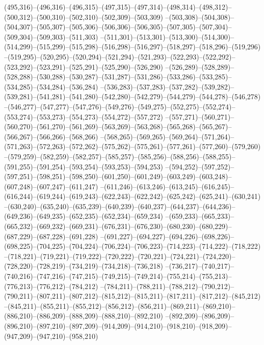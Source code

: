 (495,316)--(496,316)--(496,315)--(497,315)--(497,314)--(498,314)--(498,312)--(500,312)--(500,310)--(502,310)--(502,309)--(503,309)
--(503,308)--(504,308)--(504,307)--(505,307)--(505,306)--(506,306)--(506,305)--(507,305)--(507,304)--(509,304)--(509,303)--(511,303)
--(511,301)--(513,301)--(513,300)--(514,300)--(514,299)--(515,299)--(515,298)--(516,298)--(516,297)--(518,297)--(518,296)--(519,296)
--(519,295)--(520,295)--(520,294)--(521,294)--(521,293)--(522,293)--(522,292)--(523,292)--(523,291)--(525,291)--(525,290)--(526,290)
--(526,289)--(528,289)--(528,288)--(530,288)--(530,287)--(531,287)--(531,286)--(533,286)--(533,285)--(534,285)--(534,284)--(536,284)
--(536,283)--(537,283)--(537,282)--(539,282)--(539,281)--(541,281)--(541,280)--(542,280)--(542,279)--(544,279)--(544,278)--(546,278)
--(546,277)--(547,277)--(547,276)--(549,276)--(549,275)--(552,275)--(552,274)--(553,274)--(553,273)--(554,273)--(554,272)--(557,272)
--(557,271)--(560,271)--(560,270)--(561,270)--(561,269)--(563,269)--(563,268)--(565,268)--(565,267)--(566,267)--(566,266)--(568,266)
--(568,265)--(569,265)--(569,264)--(571,264)--(571,263)--(572,263)--(572,262)--(575,262)--(575,261)--(577,261)--(577,260)--(579,260)
--(579,259)--(582,259)--(582,257)--(585,257)--(585,256)--(588,256)--(588,255)--(591,255)--(591,254)--(593,254)--(593,253)--(594,253)
--(594,252)--(597,252)--(597,251)--(598,251)--(598,250)--(601,250)--(601,249)--(603,249)--(603,248)--(607,248)--(607,247)--(611,247)
--(611,246)--(613,246)--(613,245)--(616,245)--(616,244)--(619,244)--(619,243)--(622,243)--(622,242)--(625,242)--(625,241)--(630,241)
--(630,240)--(635,240)--(635,239)--(640,239)--(640,237)--(644,237)--(644,236)--(649,236)--(649,235)--(652,235)--(652,234)--(659,234)
--(659,233)--(665,233)--(665,232)--(669,232)--(669,231)--(676,231)--(676,230)--(680,230)--(680,229)--(687,229)--(687,228)--(691,228)
--(691,227)--(694,227)--(694,226)--(698,226)--(698,225)--(704,225)--(704,224)--(706,224)--(706,223)--(714,223)--(714,222)--(718,222)
--(718,221)--(719,221)--(719,222)--(720,222)--(720,221)--(724,221)--(724,220)--(728,220)--(728,219)--(734,219)--(734,218)--(736,218)
--(736,217)--(740,217)--(740,216)--(747,216)--(747,215)--(749,215)--(749,214)--(755,214)--(755,213)--(776,213)--(776,212)--(784,212)
--(784,211)--(788,211)--(788,212)--(790,212)--(790,211)--(807,211)--(807,212)--(815,212)--(815,211)--(817,211)--(817,212)--(845,212)
--(845,211)--(855,211)--(855,212)--(856,212)--(856,211)--(869,211)--(869,210)--(886,210)--(886,209)--(888,209)--(888,210)--(892,210)
--(892,209)--(896,209)--(896,210)--(897,210)--(897,209)--(914,209)--(914,210)--(918,210)--(918,209)--(947,209)--(947,210)--(958,210)
